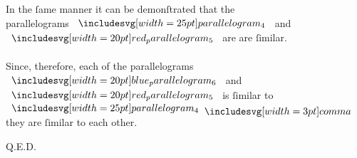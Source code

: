 \documentclass[12pt,preview]{standalone}
\begin{document}
\begin{minipage}[t]{0.64\textwidth}
    \hfill

    \begin{center}
        In the ſame manner it can be demonſtrated that the\\
        parallelograms $\img{parallelogram_4}$ and $\img[0][0][20]{red_parallelogram_5}$ are are ſimilar.\\
        \hfill\\
        Since, therefore, each of the parallelograms\\
        $\img[0][0][20]{blue_parallelogram_6}$ and $\img[0][0][20]{red_parallelogram_5}$ is ſimilar to $\img{parallelogram_4} \bcomma$\\
        they are ſimilar to each other.
    \end{center}

    \hfill

    \hfill Q.E.D.
\end{minipage}%
\end{document}
